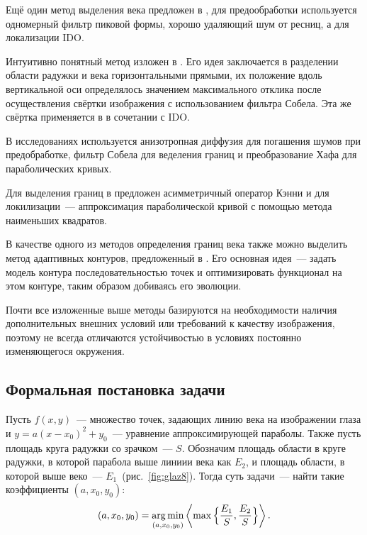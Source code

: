 \documentclass[12pt,a4paper]{article} %
\begin{document}
Ещё один метод выделения века предложен в \cite{KKX}, для предообработки используется одномерный фильтр пиковой формы, хорошо удаляющий шум от ресниц, а для локализации IDO.

Интуитивно понятный метод изложен в \cite{Masek}. Его идея заключается в разделении области радужки и века горизонтальными прямыми, их положение вдоль вертикальной оси определялось значением максимального отклика после осуществления свёртки изображения с использованием фильтра Собела. Эта же свёртка применяется в \cite{KP} в сочетании с IDO. 

В исследованиях \cite{Adam_2, Adam_1} используется анизотропная диффузия для погашения шумов при предобработке, фильтр Собела для веделения границ и преобразование Хафа для параболических кривых. 

Для выделения границ в \cite{Yang} предложен асимметричный оператор Кэнни и для локилизации~--- аппроксимация параболической кривой с помощью метода наименьших квадратов. 

В качестве одного из методов определения границ века также можно выделить метод адаптивных контуров, предложенный в \cite{Smirn}. Его основная идея~--- задать модель контура последовательностью точек и оптимизировать функционал на этом контуре, таким образом добиваясь его эволюции.

Почти все изложенные выше методы базируются на необходимости наличия дополнительных внешних условий или требований к качеству изображения, поэтому не всегда отличаются устойчивостью в условиях постоянно изменяющегося окружения. 

\subsection{Формальная постановка задачи}

Пусть $f(x, y)$~--- множество точек, задающих линию века на изображении глаза и
\newline $y=a(x-x_0)^2 + y_0$~--- уравнение аппроксимирующей параболы. Также пусть площадь круга радужки со зрачком~--- $S$.
Обозначим площадь области в круге радужки, в которой парабола выше линиии века как $E_2$, и площадь области, в которой выше веко~--- $E_1$~(рис.~\ref{fig:glaz8}). Тогда суть задачи~--- найти такие коэффициенты $(a,x_0,y_0)$:
\begin{gather}\label{minimax}
	(a,x_0, y_0)=\mathop{\rm arg\,min}\limits_{(a,x_0,y_0)}\left<\max{\Bigl\{\frac{E_1}{S}, \frac{E_2}{S}\Bigr\}}\right>.
\end{gather}
\end{document}
